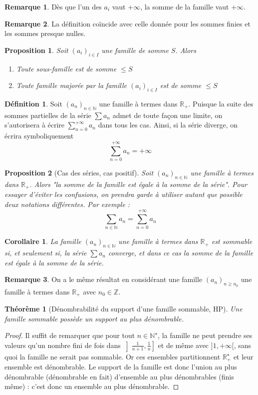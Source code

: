 \documentclass[french]{book}
\newcommand{\N}{\mathbb{N}}
\newcommand{\Z}{\mathbb{Z}}
\newcommand{\R}{\mathbb{R}}
\newcommand{\st}{^\star}
\theoremstyle{plain}
\newtheorem{thm}{Théorème}[chapter]
\newtheorem{prop}{Proposition}[chapter]
\newtheorem{cor}{Corollaire}[chapter]
\theoremstyle{definition}
\newtheorem{dfn}{Définition}[chapter]
\newtheorem{rmq}{Remarque}[chapter]
\theoremstyle{remark}
\begin{document}
\begin{rmq} Dès que l'un des $a_i$ vaut $+\infty$, la somme de la famille vaut $+\infty$. \end{rmq}
\begin{rmq} La définition coïncide avec celle donnée pour les sommes finies et les sommes presque nulles. \end{rmq}
\begin{prop}
	Soit $(a_i)_{i\in I}$ une famille de somme $S$. Alors 
	\begin{enumerate}
		\item Toute sous-famille est de somme $\leqslant S$
		\item Toute famille majorée par la famille $(a_i)_{i\in I}$ est de somme $\leqslant S$
	\end{enumerate}
\end{prop}
\begin{dfn}
	Soit $(a_n)_{n\in\N}$ une famille à termes dans $\R_+$. Puisque la suite des sommes partielles de la série $\displaystyle \sum a_n$ admet de toute façon une limite, on s'autorisera à écrire $\displaystyle \sum_{n=0}^{+\infty}a_n$ dans tous les cas. Ainsi, si la série diverge, on écrira symboliquement $$\sum_{n=0}^{+\infty}a_n=+\infty$$
\end{dfn}
\begin{prop}[Cas des séries, cas positif]
	Soit $(a_n)_{n\in\N}$ une famille à termes dans $\R_+$. Alors "la somme de la famille est égale à la somme de la série". Pour essayer d'éviter les confusions, on prendra garde à utiliser autant que possible deux notations différentes. Par exemple : $$\sum_{n\in\N}a_n=\sum_{n=0}^{+\infty}a_n$$
\end{prop}
\begin{cor}
	La famille $(a_n)_{n\in\N}$ une famille à termes dans $\R_+$ est sommable si, et seulement si, la série $\displaystyle \sum a_n$ converge, et dans ce cas la somme de la famille est égale à la somme de la série.
\end{cor}
\begin{rmq} On a le même résultat en considérant une famille $(a_n)_{n\geqslant n_0}$ une famille à termes dans $\R_+$ avec $n_0\in\Z$. \end{rmq}
\begin{thm}[Dénombrabilité du support d'une famille sommable, HP]
	Une famille sommable possède un support au plus dénombrable.
\end{thm}
\begin{proof}
	Il suffit de remarquer que pour tout $n\in\N\st$, la famille ne peut prendre ses valeurs qu'un nombre fini de fois dans $\displaystyle \left]\frac{1}{n+1},\frac1n\right]$ et de même avec $]1,+\infty[$, sans quoi la famille ne serait pas sommable. Or ces ensembles partitionnent $\R_+\st$ et leur ensemble est dénombrable. Le support de la famille est donc l'union au plus dénombrable (dénombrable en fait) d'ensemble au plus dénombrables (finis même) : c'est donc un ensemble au plus dénombrable.
\end{proof}
\end{document}
